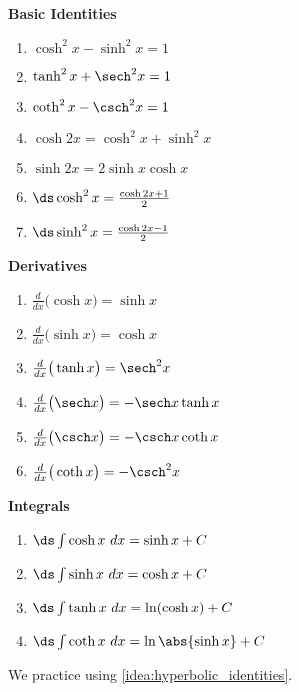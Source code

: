 \setboxwidth{160pt}
{\begin{minipage}[t]{.33\specialboxlength}
\textbf{Basic Identities}\par
{}%
\begin{enumerate}
\item $\cosh^2x-\sinh^2x=1$
\item	$\tanh^2x+\sech^2x=1$
\item	$\coth^2x-\csch^2x = 1$
\item	$\cosh 2x=\cosh^2x+\sinh^2x$
\item	$\sinh 2x = 2\sinh x\cosh x$
\item	$\ds\cosh^2x = \frac{\cosh 2x+1}{2}$
\item $\ds \sinh^2x=\frac{\cosh 2x-1}{2}$
\end{enumerate}
\end{minipage}%
\begin{minipage}[t]{.33\specialboxlength}
\textbf{Derivatives}
\begin{enumerate}
\item $\frac{d}{dx}\big(\cosh x\big) = \sinh x$
\item $\frac{d}{dx}\big(\sinh x\big) = \cosh x$
\item $\frac{d}{dx}\big(\tanh x\big) = \sech^2 x$
\item $\frac{d}{dx}\big(\sech x\big) = -\sech x\tanh x$
\item $\frac{d}{dx}\big(\csch x\big) = -\csch x\coth x$
\item $\frac{d}{dx}\big(\coth x\big) = -\csch^2x$
\end{enumerate}
\end{minipage}%
\begin{minipage}[t]{.33\specialboxlength}
\textbf{Integrals}
\begin{enumerate}
\item $\ds\int \cosh x\ dx = \sinh x+C$
\item $\ds\int \sinh x\ dx = \cosh x+C$
\item $\ds\int \tanh x\ dx = \ln(\cosh x) +C$
\item $\ds\int \coth x\ dx = \ln\abs{\sinh x}+C$
\end{enumerate}
\end{minipage}}

We practice using \autoref{idea:hyperbolic_identities}.

